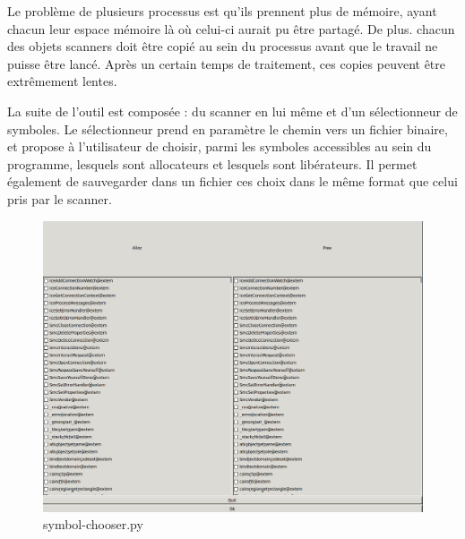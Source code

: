 Le problème de plusieurs processus est qu'ils prennent plus de mémoire, ayant chacun leur espace mémoire là où celui-ci aurait pu être partagé. De plus. chacun des objets scanners doit être copié
au sein du processus avant que le travail ne puisse être lancé. Après un certain temps de traitement, ces copies peuvent être extrêmement lentes.

La suite de l'outil est composée : du scanner en lui même et d'un sélectionneur de symboles.
Le sélectionneur prend en paramètre le chemin vers un fichier binaire, et propose à l'utilisateur de choisir, parmi les symboles accessibles au sein du programme,
lesquels sont allocateurs et lesquels sont libérateurs. Il permet également de sauvegarder dans un fichier ces choix dans le même format que celui pris par le scanner.
\begin{figure}[h]
    \centering
    \includegraphics[scale=0.3]{symbol-chooser.png}\newline
    \caption{symbol-chooser.py}
\end{figure}

